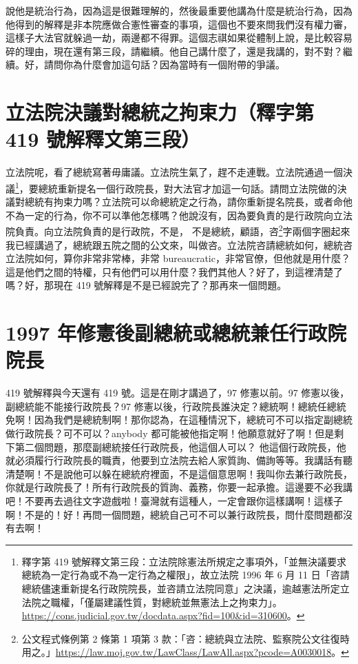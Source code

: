 \hypertarget{c08:cue:105}{}說他是統治行為，因為這是很難理解的，然後最重要他講為什麼是統治行為，因為他得到的解釋是非本院應做合憲性審查的事項，這個也不要來問我們沒有權力審，這樣子大法官就躲過一劫，兩邊都不得罪。這個志祺如果從體制上說，是比較容易碎的理由，現在還有第三段，請繼續。他自己講什麼了，還是我講的，對不對？繼續。好，請問你為什麼會加這句話？因為當時有一個附帶的爭議。

\section{立法院決議對總統之拘束力（釋字第 419 號解釋文第三段）}

\hypertarget{c08:cue:106}{}立法院呢，看了總統寫著毋庸議。立法院生氣了，趕不走連戰。立法院通過一個決議\footnote{釋字第 419 號解釋文第三段：立法院除憲法所規定之事項外，「並無決議要求總統為一定行為或不為一定行為之權限」，故立法院 1996 年 6 月 11 日「咨請總統儘速重新提名行政院院長，並咨請立法院同意」之決議，逾越憲法所定立法院之職權，「僅屬建議性質，對總統並無憲法上之拘束力」。\url{https://cons.judicial.gov.tw/docdata.aspx?fid=100&id=310600}。}，要總統重新提名一個行政院長，對大法官才加這一句話。請問立法院做的決議對總統有拘束力嗎？立法院可以命總統定之行為，請你重新提名院長，或者命他不為一定的行為，你不可以準他怎樣嗎？他說沒有，因為要負責的是行政院向立法院負責。向立法院負責的是行政院，不是，
\hypertarget{c08:cue:107}{}不是總統，顧語，咨\footnote{公文程式條例第 2 條第 1 項第 3 款：「咨：總統與立法院、監察院公文往復時用之。」\url{https://law.moj.gov.tw/LawClass/LawAll.aspx?pcode=A0030018}。}字兩個字圈起來我已經講過了，總統跟五院之間的公文來，叫做咨。立法院咨請總統如何，總統咨立法院如何，算你非常非常棒，非常 bureaucratic，非常官僚，但他就是用什麼？這是他們之間的特權，只有他們可以用什麼？我們其他人？好了，到這裡清楚了嗎？好，那現在 419 號解釋是不是已經說完了？那再來一個問題。

\section{1997 年修憲後副總統或總統兼任行政院院長}

\hypertarget{c08:cue:108}{}419 號解釋與今天還有 419 號。這是在剛才講過了，97 修憲以前。97 修憲以後，副總統能不能接行政院長？97 修憲以後，行政院長誰決定？總統啊！總統任總統免啊！因為我們是總統制啊！那你認為，在這種情況下，總統可不可以指定副總統做行政院長？可不可以？anybody 都可能被他指定啊！他願意就好了啊！但是剩下第二個問題，那麼副總統接任行政院長，他這個人可以？
\hypertarget{c08:cue:109}{}他這個行政院長，他就必須履行行政院長的職責，他要到立法院去給人家質詢、備詢等等。我講話有聽清楚啊！不是說他可以躲在總統府裡面，不是這個意思啊！我叫你去兼行政院長，你就是行政院長了！所有行政院長的質詢、義務，你要一起承擔。這邊要不必我講吧！不要再去過往文字遊戲啦！臺灣就有這種人，一定會跟你這樣講啊！這樣子啊！不是的！好！再問一個問題，總統自己可不可以兼行政院長，問什麼問題都沒有去啊！


